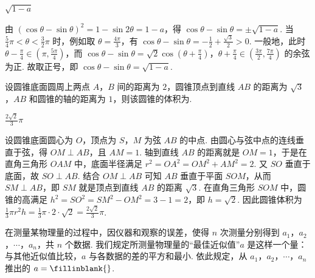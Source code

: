 \documentclass[UTF8,a4paper,oneside,11pt]{ctexbook}
\begin{document}
\begin{answer}
\(\sqrt{1 - a}\)
\end{answer}

\begin{solution}
由 \(\left(\cos \theta - \sin \theta\right)^2 = 1 - \sin 2\theta = 1 - a\)，得 \(\cos \theta - \sin \theta = \pm\sqrt{1 - a}\). 当 \(\frac{5}{4}\pi < \theta < \frac{3}{2}\pi\) 时，例如取 \(\theta = \frac{4\pi}{3}\)，有 \(\cos \theta - \sin \theta = -\frac{1}{2} + \frac{\sqrt{3}}{2} > 0\). 一般地，此时 \(\theta - \frac{\pi}{4} \in (\pi, \frac{5\pi}{4})\)，而 \(\cos \theta - \sin \theta = \sqrt{2}\cos \left(\theta + \frac{\pi}{4}\right)\)，\(\theta + \frac{\pi}{4} \in \left(\frac{3\pi}{2}, \frac{7\pi}{4}\right)\) 的余弦为正. 故取正号，即 \(\cos \theta - \sin \theta = \sqrt{1 - a}\).
\end{solution}

\begin{problem}
设圆锥底面圆周上两点 \(A\)，\(B\) 间的距离为 \(2\)，圆锥顶点到直线 \(AB\) 的距离为 \(\sqrt{3}\)，\(AB\) 和圆锥的轴的距离为 \(1\)，则该圆锥的体积为\fillinblank{}.
\end{problem}

\begin{answer}
\(\frac{2\sqrt{2}}{3}\pi\)
\end{answer}

\begin{solution}
设圆锥底面圆心为 \(O\)，顶点为 \(S\)，\(M\) 为弦 \(AB\) 的中点. 由圆心与弦中点的连线垂直于弦，得 \(OM \perp AB\)，且 \(AM = 1\). 轴到直线 \(AB\) 的距离就是 \(OM = 1\)，于是在直角三角形 \(OAM\) 中，底面半径满足 \(r^2 = OA^2 = OM^2 + AM^2 = 2\).
又 \(SO\) 垂直于底面，故 \(SO \perp AB\). 结合 \(OM \perp AB\) 可知 \(AB\) 垂直于平面 \(SOM\)，从而 \(SM \perp AB\)，即 \(SM\) 就是顶点到直线 \(AB\) 的距离 \(\sqrt{3}\). 在直角三角形 \(SOM\) 中，圆锥的高满足 \(h^2 = SO^2 = SM^2 - OM^2 = 3 - 1 = 2\)，即 \(h = \sqrt{2}\). 因此圆锥体积为 \(\frac{1}{3}\pi r^2 h = \frac{1}{3}\pi \cdot 2 \cdot \sqrt{2} = \frac{2\sqrt{2}}{3}\pi\).
\end{solution}

\begin{problem}
在测量某物理量的过程中，因仪器和观察的误差，使得 \(n\) 次测量分别得到 \(a_1\)，\(a_2\)，\(\cdots\)，\(a_n\)，共 \(n\) 个数据. 我们规定所测量物理量的“最佳近似值”\(a\) 是这样一个量：与其他近似值比较，\(a\) 与各数据的差的平方和最小. 依此规定，从 \(a_1\)，\(a_2\)，\(\cdots\)，\(a_n\) 推出的 \(a =\fillinblank{}\).
\end{problem}
\end{document}
